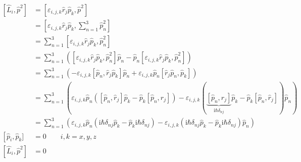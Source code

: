     \begin{align*}
        \left[ \hat{L}_i, \hat{p}^2 \right] &= \left[ \varepsilon_{i,j,k} \hat{r}_j \hat{p}_k, \hat{p}^2 \right]\\
        &= \left[ \varepsilon_{i,j,k} \hat{r}_j \hat{p}_k, \sum_{n=1}^{3} \hat{p}_n^2 \right]\\
        &= \sum_{n=1}^{3} \left[ \varepsilon_{i,j,k} \hat{r}_j \hat{p}_k, \hat{p}_n^2 \right]\\
        &= \sum_{n=1}^{3} \left( \left[ \varepsilon_{i,j,k} \hat{r}_j \hat{p}_k, \hat{p}_n^2 \right] \hat{p}_n - \hat{p}_n \left[ \varepsilon_{i,j,k} \hat{r}_j \hat{p}_k, \hat{p}_n^2 \right] \right)\\
        &= \sum_{n=1}^{3} \left( - \varepsilon_{i,j,k} \left[ \hat{p}_n,\hat{r}_j \hat{p}_k  \right] \hat{p}_n + \varepsilon_{i,j,k} \hat{p}_n \left[ \hat{r}_j \hat{p}_n,\hat{p}_k \right] \right)\\
        &= \sum_{n=1}^{3} \left( \varepsilon_{i,j,k} \hat{p}_n \left( \left[ \hat{p}_n, \hat{r}_j \right] \hat{p}_k - \hat{p}_k \left[ \hat{p}_n, \hat{r}_j \right] \right) 
        - \varepsilon_{i,j,k} \left( \underbrace{\left[ \hat{p}_n, \hat{r}_j \right]}_{\text{i}\hbar \delta_{nj}} \hat{p}_k - \hat{p}_k \left[ \hat{p}_n, \hat{r}_j \right] \right) \hat{p}_n \right)\\
        &= \sum_{n=1}^{3} \left( \varepsilon_{i,j,k} \hat{p}_n \left( \text{i}\hbar \delta_{nj} \hat{p}_k - \hat{p}_k \text{i}\hbar \delta_{nj} \right) 
        - \varepsilon_{i,j,k}  \left( \text{i}\hbar \delta_{nj} \hat{p}_k - \hat{p}_k \text{i}\hbar \delta_{nj} \right) \hat{p}_n \right)\\
        \left[ \hat{p}_i, \hat{p}_k] &= 0 \qquad i,k = x,y,z\\
        \left[ \hat{L}_i, \hat{p}^2 \right] &= 0
    \end{align*}




